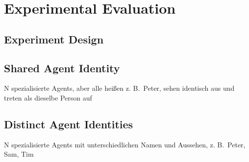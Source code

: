 \chapter{Experimental Evaluation}\label{chapter:Experimental Evaluation}


\section{Experiment Design}


\section{Shared Agent Identity}
	N spezialisierte Agents, aber alle heißen z. B. Peter, sehen identisch aus und treten als dieselbe Person auf
	
\section{Distinct Agent Identities}
N spezialisierte Agents mit unterschiedlichen Namen und Aussehen, z. B. Peter, Sam, Tim